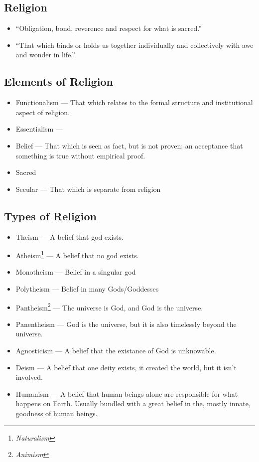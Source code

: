 \documentclass{article}
\begin{document}
    \begin{spacing}{1.2}
    \newpage
        \section*{Religion}
        \begin{itemize}
            \item ``Obligation, bond, reverence and respect for what is sacred.''
            \item ``That which binds or holds us together individually and collectively with awe and wonder in life.''
        \end{itemize}
        \subsection*{Elements of Religion}
        \begin{itemize}
            \item Functionalism --- That which relates to the formal structure and institutional aspect of religion.
            \item Essentialism --- \textinterrobang
            \item Belief --- That which is seen as fact, but is not proven; an acceptance that something is true without empirical proof.
            \item Sacred
            \item Secular --- That which is separate from religion
        \end{itemize}
        \subsection*{Types of Religion}
        \begin{itemize}
            \item Theism --- A belief that god exists.
            \item Atheism\footnote{\textit{Naturalism}} --- A belief that no god exists.
            \item Monotheism --- Belief in a singular god
            \item Polytheism --- Belief in many Gods/Goddesses
            \item Pantheism\footnote{\textit{Animism}} --- The universe is God, and God is the universe.
            \item Panentheism --- God is the universe, but it is also timelessly beyond the universe.
            \item Agnosticism --- A belief that the existance of God is unknowable.
            \item Deism --- A belief that one deity exists, it created the world, but it isn't involved.
            \item Humanism --- A belief that human beings alone are responsible for what happens on Earth. Usually bundled with a great belief in the, mostly innate, goodness of human beings.
        \end{itemize}

\end{spacing}
\end{document}
